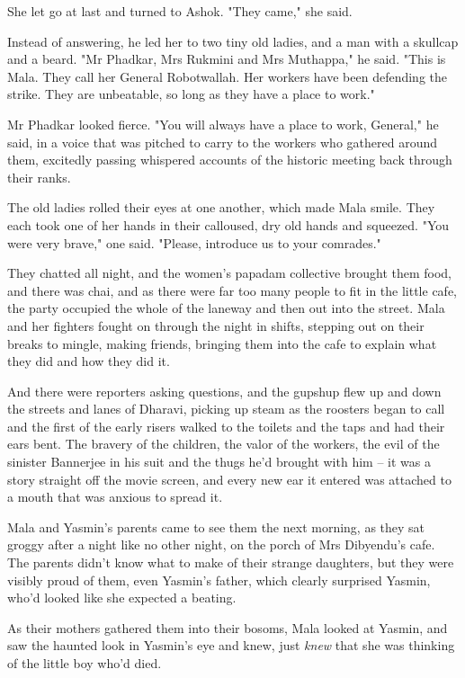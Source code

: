 She let go at last and turned to Ashok. "They came," she said.

Instead of answering, he led her to two tiny old ladies, and a man
with a skullcap and a beard. "Mr Phadkar, Mrs Rukmini and Mrs
Muthappa," he said. "This is Mala. They call her General
Robotwallah. Her workers have been defending the strike. They are
unbeatable, so long as they have a place to work."

Mr Phadkar looked fierce. "You will always have a place to work,
General," he said, in a voice that was pitched to carry to the
workers who gathered around them, excitedly passing whispered
accounts of the historic meeting back through their ranks.

The old ladies rolled their eyes at one another, which made Mala
smile. They each took one of her hands in their calloused, dry old
hands and squeezed. "You were very brave," one said. "Please,
introduce us to your comrades."

They chatted all night, and the women's papadam collective brought
them food, and there was chai, and as there were far too many
people to fit in the little cafe, the party occupied the whole of
the laneway and then out into the street. Mala and her fighters
fought on through the night in shifts, stepping out on their breaks
to mingle, making friends, bringing them into the cafe to explain
what they did and how they did it.

And there were reporters asking questions, and the gupshup flew up
and down the streets and lanes of Dharavi, picking up steam as the
roosters began to call and the first of the early risers walked to
the toilets and the taps and had their ears bent. The bravery of
the children, the valor of the workers, the evil of the sinister
Bannerjee in his suit and the thugs he'd brought with him -- it was
a story straight off the movie screen, and every new ear it entered
was attached to a mouth that was anxious to spread it.

Mala and Yasmin's parents came to see them the next morning, as
they sat groggy after a night like no other night, on the porch of
Mrs Dibyendu's cafe. The parents didn't know what to make of their
strange daughters, but they were visibly proud of them, even
Yasmin's father, which clearly surprised Yasmin, who'd looked like
she expected a beating.

As their mothers gathered them into their bosoms, Mala looked at
Yasmin, and saw the haunted look in Yasmin's eye and knew, just
\emph{knew} that she was thinking of the little boy who'd died.

